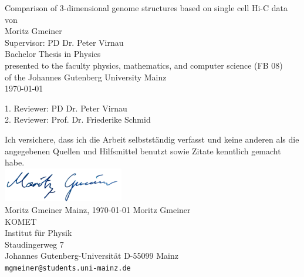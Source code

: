 \documentclass[a4paper,11pt,oneside,final,english,toc=bib,draft]{scrbook}
\begin{document}

\begin{titlepage}
  \vspace*{6mm}
  \begin{center}
     {\afont Comparison of 3-dimensional genome structures based on single cell Hi-C data}
     \\[3.5cm]
     {\large von}
     \\[3.5cm]
     {\dfont Moritz Gmeiner}
     \\[1.5cm]
     {\dfont Supervisor: PD Dr. Peter Virnau}
     \\[2cm]
     {\large Bachelor Thesis in Physics \/\\
        presented to the faculty physics, mathematics, and computer science (FB 08) \/\\
        of the Johannes Gutenberg University Mainz \/\\
        \today}
   \end{center}
   \vfill
   1. Reviewer: PD Dr. Peter Virnau \\	
   2. Reviewer: Prof. Dr. Friederike Schmid \\
   \vfill
\end{titlepage}

\thispagestyle{empty}
Ich versichere, dass ich die Arbeit selbstständig verfasst und keine 
anderen als die angegebenen Quellen und Hilfsmittel benutzt sowie 
Zitate kenntlich gemacht habe.
\\[1cm]
\includegraphics[height=1.5cm]{Unterschrift.png} \\
Moritz Gmeiner \hfill Mainz, \today
\vfill
\noindent 
Moritz Gmeiner\\
KOMET\\
Institut für Physik\\
Staudingerweg 7\\
Johannes Gutenberg-Universität
D-55099 Mainz\\
{ \texttt{mgmeiner@students.uni-mainz.de} }
\end{document}
